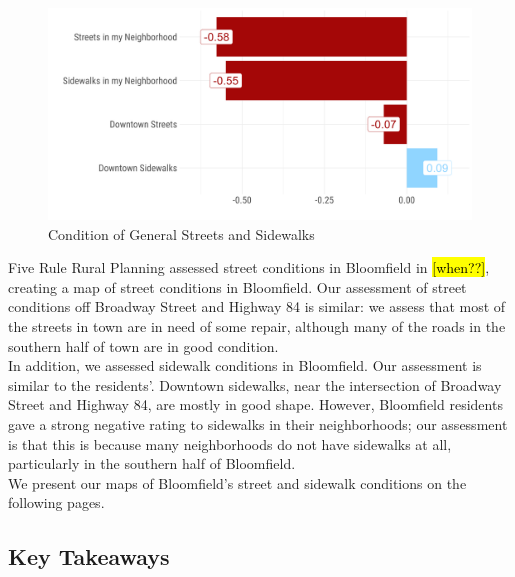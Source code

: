 \begin{figure}[H]
\centering
\begin{framed}
    \caption{Condition of General Streets and Sidewalks}
    \label{fig:scoreStreetsGeneral}
    \includegraphics[width = \linewidth]{figures/score_streets_general.png}
\end{framed}
\end{figure}

\noindent Five Rule Rural Planning assessed street conditions in Bloomfield in \hl{[when??]}, creating a map of street conditions in Bloomfield. Our assessment of street conditions off Broadway Street and Highway 84 is similar: we assess that most of the streets in town are in need of some repair, although many of the roads in the southern half of town are in good condition.\\

\noindent In addition, we assessed sidewalk conditions in Bloomfield. Our assessment is similar to the residents'. Downtown sidewalks, near the intersection of Broadway Street and Highway 84, are mostly in good shape. However, Bloomfield residents gave a strong negative rating to sidewalks in their neighborhoods; our assessment is that this is because many neighborhoods do not have sidewalks at all, particularly in the southern half of Bloomfield.\\

\noindent We present our maps of Bloomfield's street and sidewalk conditions on the following pages.

\pagebreak
\thispagestyle{empty}
\begin{landscape}
    
\end{landscape}
\pagebreak

\pagebreak
\thispagestyle{empty}
\begin{landscape}
    
\end{landscape}
\pagebreak

\subsection*{Key Takeaways}